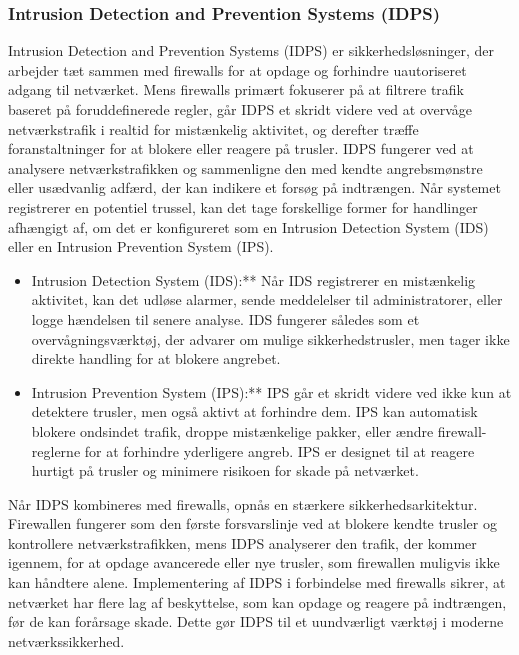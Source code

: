 \subsubsection{Intrusion Detection and Prevention Systems (IDPS)}
Intrusion Detection and Prevention Systems (IDPS) er sikkerhedsløsninger, der arbejder tæt sammen med firewalls for at opdage og forhindre uautoriseret adgang til netværket. Mens firewalls primært fokuserer på at filtrere trafik baseret på foruddefinerede regler, går IDPS et skridt videre ved at overvåge netværkstrafik i realtid for mistænkelig aktivitet, og derefter træffe foranstaltninger for at blokere eller reagere på trusler.
\newline\newline\noindent
IDPS fungerer ved at analysere netværkstrafikken og sammenligne den med kendte angrebsmønstre eller usædvanlig adfærd, der kan indikere et forsøg på indtrængen. Når systemet registrerer en potentiel trussel, kan det tage forskellige former for handlinger afhængigt af, om det er konfigureret som en Intrusion Detection System (IDS) eller en Intrusion Prevention System (IPS).

\begin{itemize}
	\item Intrusion Detection System (IDS):** Når IDS registrerer en mistænkelig aktivitet, kan det udløse alarmer, sende meddelelser til administratorer, eller logge hændelsen til senere analyse. IDS fungerer således som et overvågningsværktøj, der advarer om mulige sikkerhedstrusler, men tager ikke direkte handling for at blokere angrebet.
	
	\item Intrusion Prevention System (IPS):** IPS går et skridt videre ved ikke kun at detektere trusler, men også aktivt at forhindre dem. IPS kan automatisk blokere ondsindet trafik, droppe mistænkelige pakker, eller ændre firewall-reglerne for at forhindre yderligere angreb. IPS er designet til at reagere hurtigt på trusler og minimere risikoen for skade på netværket.
\end{itemize}

Når IDPS kombineres med firewalls, opnås en stærkere sikkerhedsarkitektur. Firewallen fungerer som den første forsvarslinje ved at blokere kendte trusler og kontrollere netværkstrafikken, mens IDPS analyserer den trafik, der kommer igennem, for at opdage avancerede eller nye trusler, som firewallen muligvis ikke kan håndtere alene.
\newline\newline\noindent
Implementering af IDPS i forbindelse med firewalls sikrer, at netværket har flere lag af beskyttelse, som kan opdage og reagere på indtrængen, før de kan forårsage skade. Dette gør IDPS til et uundværligt værktøj i moderne netværkssikkerhed.


